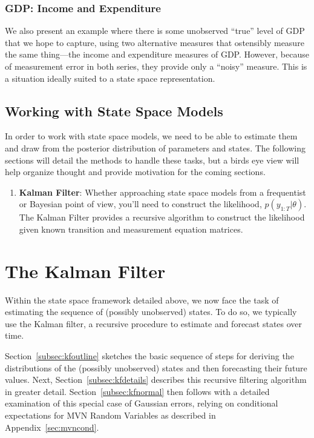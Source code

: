 \documentclass[a4paper,12pt]{article}
\begin{document}
\subsubsection{GDP: Income and Expenditure}
We also present an example where there is some unobserved ``true'' level
of GDP that we hope to capture, using two alternative measures that
ostensibly measure the same thing---the income and expenditure measures
of GDP\@. However, because of measurement error in both series, they
provide only a ``noisy'' measure. This is a situation ideally suited to
a state space representation.

\clearpage
\subsection{Working with State Space Models}

In order to work with state space models, we need to be able to
estimate them and draw from the posterior distribution of parameters and
states.  The following sections will detail the methods to handle these
tasks, but a birds eye view will help organize thought and provide
motivation for the coming sections.
\begin{enumerate}
  \item \textbf{Kalman Filter}: Whether approaching state space models
    from a frequentist or Bayesian point of view, you'll need to
    construct the likelihood, $p(y_{1:T}|\theta)$. The Kalman Filter
    provides a recursive algorithm to construct the likelihood given
    known transition and measurement equation matrices.

\end{enumerate}



\newpage
\section{The Kalman Filter}

Within the state space framework detailed above, we now face the task of estimating the sequence of (possibly unobserved) states. To do so, we typically use the Kalman filter, a recursive procedure to estimate and forecast states over time.

Section~\ref{subsec:kfoutline} sketches the basic sequence of steps for
deriving the distributions of the (possibly unobserved) states and then
forecasting their future values. Next, Section~\ref{subsec:kfdetails}
describes this recursive filtering algorithm in greater detail.
Section~\ref{subsec:kfnormal} then follows with a detailed examination
of this special case of Gaussian errors, relying on conditional
expectations for MVN Random Variables as described in
Appendix~\ref{sec:mvncond}.
\end{document}
